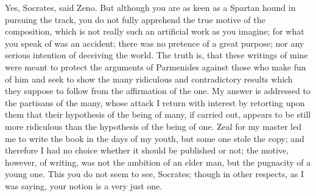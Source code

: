 Yes, Socrates, said Zeno. But although you are as keen as a Spartan
hound in pursuing the track, you do not fully apprehend the true motive
of the composition, which is not really such an artificial work as you
imagine; for what you speak of was an accident; there was no pretence of
a great purpose; nor any serious intention of deceiving the world.
The truth is, that these writings of mine were meant to protect the
arguments of Parmenides against those who make fun of him and seek to
show the many ridiculous and contradictory results which they suppose
to follow from the affirmation of the one. My answer is addressed to the
partisans of the many, whose attack I return with interest by retorting
upon them that their hypothesis of the being of many, if carried out,
appears to be still more ridiculous than the hypothesis of the being
of one. Zeal for my master led me to write the book in the days of
my youth, but some one stole the copy; and therefore I had no choice
whether it should be published or not; the motive, however, of writing,
was not the ambition of an elder man, but the pugnacity of a young one.
This you do not seem to see, Socrates; though in other respects, as I
was saying, your notion is a very just one.

